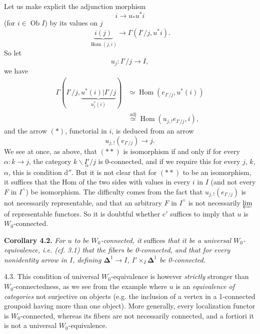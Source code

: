 \documentclass[11pt]{article}
\newcommand{\printedpage}[1]{\marginpar{\footnotesize p.~#1}}
\newcommand{\msp}[1]{\marginpar{\footnotesize [#1]}}
\newcommand{\Hom}{\operatorname{Hom}}
\newcommand{\Ob}{\operatorname{Ob}}
\newcommand{\bDelta}{\boldsymbol{\Delta}}
\begin{document}
\msp{page 55}Let us make explicit the adjunction morphism
\[
i \longrightarrow u_*u^*i
\]
(for $i \in \Ob I$) by its values on $j$
\[
\underbrace{i(j)}_{\Hom(j,i)} \longrightarrow \Gamma(I'/j, u^*i). \tag*{$(\ast)$}
\]
So let
\[
u_j : I'/j \longrightarrow I,
\]
\printedpage{35}
we have
\[
\begin{aligned}
\Gamma(I'/j, \underbrace{u^*(i)|I'/j}_{u_j^*(i)}) &\simeq \Hom(e_{I'/j}, u^*(i)) \\ %
&\overset{\mathrm{adj}}{\simeq} \Hom(u_{j,!}e_{I'/j}, i),
\end{aligned}
\]
and the arrow $(\ast)$, functorial in $i$, is deduced from an arrow
\[
u_{j,!}(e_{I'/j}) \longrightarrow j. \tag*{$(\ast\ast)$}
\]
We see at once, as above, that $(\ast\ast)$ is isomorphism if and only if for every $\alpha : k \longrightarrow j$, the category $k\backslash\underset{\alpha}{I'}/j$ is 0-connected, and if we require this for every $j$, $k$, $\alpha$, this is condition d$''$. But it is not clear that for $(\ast\ast)$ to be an isomorphism, it suffices that the Hom of the two sides with values in every $i$ in $I$ (and not every $F$ in $I^{\wedge}$) be isomorphism. The difficulty comes from the fact that $u_{j,!}(e_{I'/j})$ is not necessarily representable, and that an arbitrary $F$ in $I^{\wedge}$ \msp{page 56}is not necessarily $\varprojlim$ of representable functors. So it is doubtful whether c$'$ suffices to imply that $u$ is $W_0$-connected.

\textbf{Corollary 4.2.} \textit{For $u$ to be $W_0$-connected, it} suffices \textit{that it be a universal $W_0$-equivalence, i.e. (cf. 3.1) that the fibers be \textup{0}-connected, and that for every nonidentity arrow in $I$, defining $\bDelta^1 \longrightarrow I$, $I' \times_I \bDelta^1$ be \textup{0}-connected.}

4.3. This condition of universal $W_0$-equivalence is however \textit{strictly} stronger than $W_0$-connectedness, as we see from the example where $u$ is an \textit{equivalence of categories} not surjective on objects (e.g. the inclusion of a vertex in a 1-connected groupoid having more than one object). More generally, every localization functor is $W_0$-connected, whereas its fibers are not necessarily connected, and a fortiori it is not a universal $W_0$-equivalence.
\end{document}
